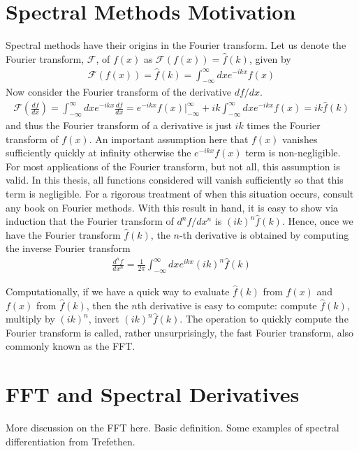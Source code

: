 \section{Spectral Methods Motivation}
Spectral methods have their origins in the Fourier transform. Let us denote the Fourier transform, $\mathcal{F}$, of $f(x)$ as $\mathcal{F}(f(x)) = \hat{f}(k)$, given by
\begin{align}
\mathcal{F}(f(x)) = \hat{f}(k) = \int_{-\infty}^{\infty}dxe^{-ikx}f(x)\label{fouriertransform}
\end{align}
Now consider the Fourier transform of the derivative $df/dx$. 
\begin{align}
\mathcal{F}\left(\frac{df}{dx}\right)= \int_{-\infty}^{\infty}dxe^{-ikx}\frac{df}{dx}=e^{-ikx}f(x)\bigg|_{-\infty}^{\infty} + ik\int_{-\infty}^{\infty}dxe^{-ikx}f(x)= ik\hat{f}(k)
\end{align}
and thus the Fourier transform of a derivative is just $ik$ times the Fourier transform of $f(x)$. An important assumption here that $f(x)$ vanishes sufficiently quickly at infinity otherwise the $e^{-ikx}f(x)$ term is non-negligible. For most applications of the Fourier transform, but not all,  this assumption is valid. In this thesis, all functions considered will vanish sufficiently so that this term is negligible. For a rigorous treatment of when this situation occurs, consult any book on Fourier methods. With this result in hand, it is easy to show via induction that the Fourier transform of $d^{n}f/dx^{n}$ is $(ik)^{n}\hat{f}(k)$. Hence, once we have the Fourier transform $\hat{f}(k)$, the $n$-th derivative is obtained by computing the inverse Fourier transform
\begin{align}
\frac{d^{n}f}{dx^{n}} = \frac{1}{2\pi} \int_{-\infty}^{\infty}dx e^{ikx}(ik)^{n}\hat{f}(k)
\end{align}

Computationally, if we have a quick way to evaluate $\hat{f}(k)$ from $f(x)$ and $f(x)$ from $\hat{f}(k)$, then the $n$th derivative is easy to compute: compute $\hat{f}(k)$, multiply by $(ik)^{n}$, invert $(ik)^{n}\hat{f}(k)$. The operation to quickly compute the Fourier transform is called, rather unsurprisingly, the fast Fourier transform, also commonly known as the FFT. 

\section{FFT and Spectral Derivatives} 
More discussion on the FFT here. Basic definition. Some examples of spectral differentiation from Trefethen.

